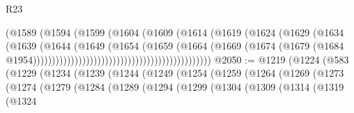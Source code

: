 \begin{lexlean}{R23}
\begin{coremodule}
{{{{{{{{{{{{{{{{{{{{{                                                          (@1589
                                                            (@1594
                                                              (@1599
                                                                (@1604
                                                                  (@1609
                                                                    (@1614
                                                                      (@1619
                                                                        (@1624
                                                                          (@1629
                                                                            (@1634
                                                                              (@1639
                                                                                (@1644
                                                                                  (@1649
                                                                                    (@1654
                                                                                      (@1659
                                                                                        (@1664
                                                                                          (@1669
                                                                                            (@1674
                                                                                              (@1679
                                                                                                (@1684
                                                                                                  @1954)))))))))))))))))))))))))))))))))))))))))))))))
@2050 := @1219
    (@1224
      (@583
        (@1229
          (@1234
            (@1239
              (@1244
                (@1249
                  (@1254
                    (@1259
                      (@1264
                        (@1269
                          (@1273
                            (@1274
                              (@1279
                                (@1284
                                  (@1289
                                    (@1294
                                      (@1299
                                        (@1304
                                          (@1309
                                            (@1314
                                              (@1319
                                                (@1324
}}}}}}}}}}}}}}}}}}}}}
\end{coremodule}
\end{lexlean}
